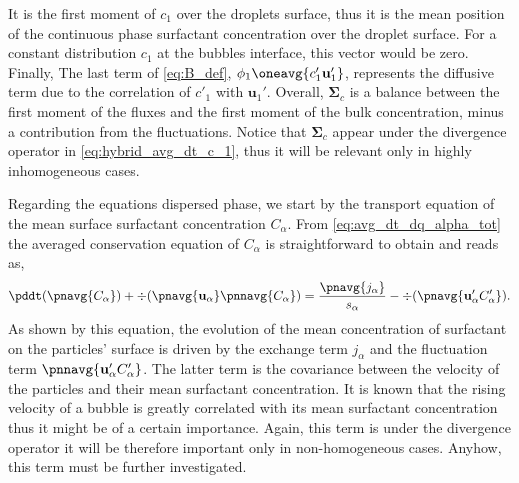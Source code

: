 It is the first moment of $c_1$ over the droplets surface, thus it is the mean position of the continuous phase surfactant concentration over the droplet surface.
For a constant distribution $c_1$ at the bubbles interface, this vector would be zero. 
Finally, The last term of \ref{eq:B_def}, $\phi_1\oneavg{c'_1\textbf{u}_1'}$, represents the diffusive term due to the correlation of $c'_1$ with $\textbf{u}_1'$.
Overall, $\mathbf{\Sigma}_c$ is a balance between the first moment of the fluxes and the first moment of the bulk concentration, minus a contribution from the fluctuations.
Notice that $\mathbf{\Sigma}_c$ appear under the divergence operator in \ref{eq:hybrid_avg_dt_c_1}, thus it will be relevant only in highly inhomogeneous cases. 

Regarding the equations dispersed phase, we start by the transport equation of the mean surface surfactant concentration $C_\alpha$.
From \ref{eq:avg_dt_dq_alpha_tot} the averaged conservation equation of $C_\alpha$ is straightforward to obtain and reads as,
\begin{equation}
    \pddt (\pnavg{C_\alpha})
    + \div (\pnavg{\textbf{u}_\alpha} \pnnavg{C_\alpha})
    =
    \frac{\pnavg{j_\alpha}}{s_\alpha}
    - \div (\pnavg{\textbf{u}_\alpha' C'_\alpha}).
    \label{eq:avg_dt_dC_alpha}
\end{equation}
As shown by this equation, the evolution of the mean concentration of surfactant on the particles' surface is driven by the exchange term $j_\alpha$ and the fluctuation term $\pnnavg{\textbf{u}_\alpha' C_\alpha'}$. 
The latter term is the covariance between the velocity of the particles and their mean surfactant concentration. 
It is known that the rising velocity of a bubble is greatly correlated with its mean surfactant concentration \citet{kentheswaran2022direct} thus it might be of a certain importance. 
Again, this term is under the divergence operator it will be therefore important only in non-homogeneous cases. 
Anyhow, this term must be further investigated.

